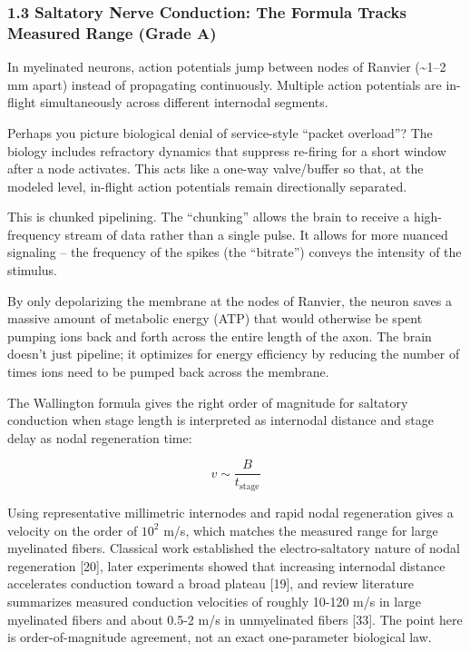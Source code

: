 \documentclass[
  11pt,
]{article}
\begin{document}
\subsubsection{1.3 Saltatory Nerve Conduction: The Formula Tracks
Measured Range (Grade
A)}\label{saltatory-nerve-conduction-the-formula-tracks-measured-range-grade-a}

In myelinated neurons, action potentials jump between nodes of Ranvier
(\textasciitilde1--2 mm apart) instead of propagating continuously.
Multiple action potentials are in-flight simultaneously across different
internodal segments.

Perhaps you picture biological denial of service-style ``packet
overload''? The biology includes refractory dynamics that suppress
re-firing for a short window after a node activates. This acts like a
one-way valve/buffer so that, at the modeled level, in-flight action
potentials remain directionally separated.

This is chunked pipelining. The ``chunking'' allows the brain to receive
a high-frequency stream of data rather than a single pulse. It allows
for more nuanced signaling -- the frequency of the spikes (the
``bitrate'') conveys the intensity of the stimulus.

By only depolarizing the membrane at the nodes of Ranvier, the neuron
saves a massive amount of metabolic energy (ATP) that would otherwise be
spent pumping ions back and forth across the entire length of the axon.
The brain doesn't just pipeline; it optimizes for energy efficiency by
reducing the number of times ions need to be pumped back across the
membrane.

The Wallington formula gives the right order of magnitude for saltatory
conduction when stage length is interpreted as internodal distance and
stage delay as nodal regeneration time:

\[
v \sim \frac{B}{t_{\text{stage}}}
\]

Using representative millimetric internodes and rapid nodal regeneration
gives a velocity on the order of \(10^2\) m/s, which matches the
measured range for large myelinated fibers. Classical work established
the electro-saltatory nature of nodal regeneration {[}20{]}, later
experiments showed that increasing internodal distance accelerates
conduction toward a broad plateau {[}19{]}, and review literature
summarizes measured conduction velocities of roughly 10-120 m/s in large
myelinated fibers and about 0.5-2 m/s in unmyelinated fibers {[}33{]}.
The point here is order-of-magnitude agreement, not an exact
one-parameter biological law.
\end{document}
